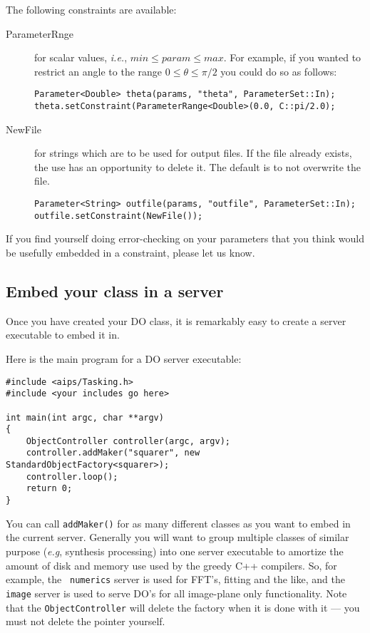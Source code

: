 The following constraints are available:
\begin{description}

  \item[ParameterRnge] for scalar values, {\em i.e.}, ${min}
\le {param} \le max$. For example, if you wanted to restrict an angle to
the range $0 \le \theta \le \pi/2$ you could do so as follows:

\begin{verbatim}
Parameter<Double> theta(params, "theta", ParameterSet::In);
theta.setConstraint(ParameterRange<Double>(0.0, C::pi/2.0);
\end{verbatim}

    \item[NewFile] for strings which are to be used for output
    files. If the file already exists, the use has an opportunity to
    delete it. The default is to not overwrite the file.
\begin{verbatim}
Parameter<String> outfile(params, "outfile", ParameterSet::In);
outfile.setConstraint(NewFile());
\end{verbatim}

\end{description}


If you find yourself doing error-checking on your parameters that you
think would be usefully embedded in a constraint, please let us know.

\subsection{Embed your class in a server}

Once you have created your DO class, it is remarkably easy to create a
server executable to embed it in.

Here is the main program for a DO server executable:

\begin{verbatim}
#include <aips/Tasking.h>
#include <your includes go here>

int main(int argc, char **argv)
{
    ObjectController controller(argc, argv);
    controller.addMaker("squarer", new StandardObjectFactory<squarer>);
    controller.loop();
    return 0;
}
\end{verbatim}

You can call {\tt addMaker()} for as many different classes as you
want to embed in the current server. Generally you will want to group
multiple classes of similar purpose ({\em e.g}, synthesis processing)
into one server executable to amortize the amount of disk and memory
use used by the greedy C++ compilers. So, for example, the {\tt
numerics} server is used for FFT's, fitting and the like, and the {\tt
image} server is used to serve DO's for all image-plane only
functionality. Note that the {\tt ObjectController} will delete the
factory when it is done with it --- you must not delete the pointer
yourself.



